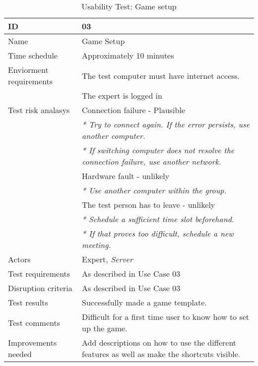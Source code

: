 {\footnotesize
\begin{table}[H]
\begin{tabular}{| p{5cm} | p{10cm} |}\hline
	\textbf{ID}	& \textbf{03} \\ \hline
	Name		& Game Setup\\ \hline
	Time schedule	& Approximately 10 minutes\\ \hline
	Enviorment requirements 
		& The test computer must have internet access. \\
		& The expert is logged in\\ \hline
	Test risk analasys 
		& Connection failure - Plausible \\
		& \emph{* Try to connect again. If the error persists, use another computer.} \\
		& \emph{* If switching computer does not resolve the connection failure, use another network.}\\
		& Hardware fault - unlikely \\
		& \emph{* Use another computer within the group.} \\
		& The test person has to leave - unlikely \\
		& \emph{* Schedule a sufficient time slot beforehand.} \\
		& \emph{* If that proves too difficult, schedule a new meeting.}\\ \hline
	Actors	& Expert, \emph{Server}\\ \hline
	Test requirements & As described in Use Case 03 \\ \hline
	Disruption criteria & As described in Use Case 03  \\ \hline
	Test results & Successfully made a game template.
		& \\ \hline
	Test comments & Difficult for a first time user to know how to set up the game.
		& \\ \hline
	Improvements needed & Add descriptions on how to use the different features as well as make the shortcuts visible.
		& \\ \hline
\end{tabular}


\caption{Usability Test: Game setup}
\label{fig:usability_test_3}
\end{table}}



